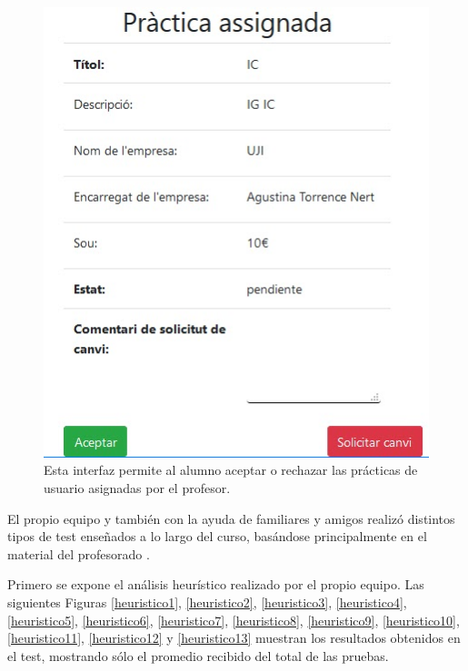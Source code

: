 \documentclass[pdftex,11pt,a4paper]{book}
\begin{document}
\begin{figure}[h]
\begin{center}
\includegraphics[width=\textwidth]{img/intefaz3.jpg}
\caption{\label{interfaz3}Esta interfaz permite al alumno aceptar o rechazar las prácticas de usuario asignadas por el profesor.}
\end{center}
\end{figure}

El propio equipo y también con la ayuda de familiares y amigos realizó distintos tipos de test enseñados a lo largo del curso, basándose principalmente en el material del profesorado \cite{evaluacion}.

Primero se expone el análisis heurístico realizado por el propio equipo. Las siguientes Figuras \ref{heuristico1}, \ref{heuristico2}, \ref{heuristico3}, \ref{heuristico4}, \ref{heuristico5}, \ref{heuristico6}, \ref{heuristico7}, \ref{heuristico8}, \ref{heuristico9}, \ref{heuristico10}, \ref{heuristico11}, \ref{heuristico12} y \ref{heuristico13} muestran los resultados obtenidos en el test, mostrando sólo el promedio recibido del total de las pruebas.
\end{document}
